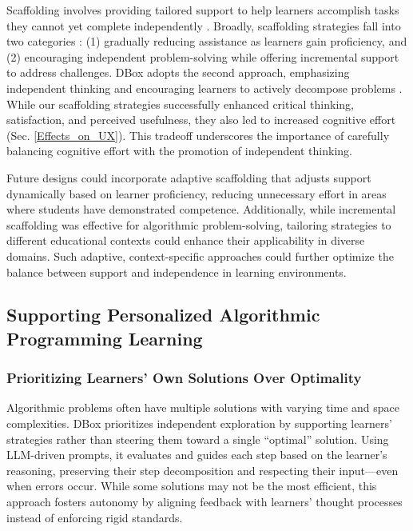 {Scaffolding involves providing tailored support to help learners accomplish tasks they cannot yet complete independently \cite{kim2011scaffolding, tobias2009constructivist}. Broadly, scaffolding strategies fall into two categories \cite{van2010scaffolding}: (1) gradually reducing assistance as learners gain proficiency, and (2) encouraging independent problem-solving while offering incremental support to address challenges. DBox adopts the second approach, emphasizing independent thinking and encouraging learners to actively decompose problems \cite{zimmerman2013theories}. While our scaffolding strategies successfully enhanced critical thinking, satisfaction, and perceived usefulness, they also led to increased cognitive effort (Sec. \ref{Effects_on_UX}). This tradeoff underscores the importance of carefully balancing cognitive effort with the promotion of independent thinking.

Future designs could incorporate adaptive scaffolding that adjusts support dynamically based on learner proficiency, reducing unnecessary effort in areas where students have demonstrated competence. Additionally, while incremental scaffolding was effective for algorithmic problem-solving, tailoring strategies to different educational contexts could enhance their applicability in diverse domains. Such adaptive, context-specific approaches could further optimize the balance between support and independence in learning environments.


\subsection{Supporting Personalized Algorithmic Programming Learning}

\subsubsection{\textbf{Prioritizing Learners' Own Solutions Over Optimality}}

Algorithmic problems often have multiple solutions with varying time and space complexities. DBox prioritizes independent exploration by supporting learners' strategies rather than steering them toward a single ``optimal'' solution. Using LLM-driven prompts, it evaluates and guides each step based on the learner's reasoning, preserving their step decomposition and respecting their input—even when errors occur. While some solutions may not be the most efficient, this approach fosters autonomy by aligning feedback with learners’ thought processes instead of enforcing rigid standards.

}
